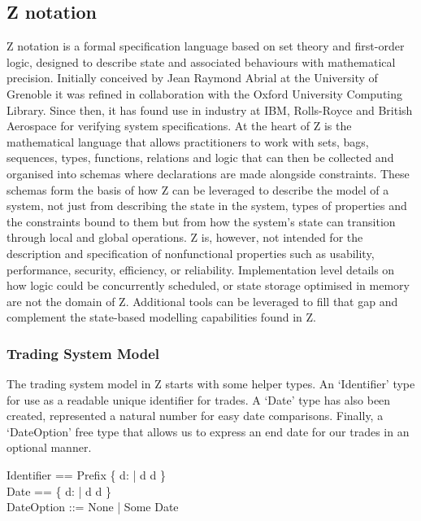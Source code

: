 \documentclass{article}
\begin{document}
\subsection*{Z notation}

Z notation is a formal specification language based on set theory and first-order logic, designed to describe state and associated behaviours with mathematical precision. Initially conceived by Jean Raymond Abrial at the University of Grenoble it was refined in collaboration with the Oxford University Computing Library. Since then, it has found use in industry at IBM, Rolls-Royce and British Aerospace for verifying system specifications.
\newline \newline
At the heart of Z is the mathematical language that allows practitioners to work with sets, bags, sequences, types, functions, relations and logic that can then be collected and organised into schemas where declarations are made alongside constraints. These schemas form the basis of how Z can be leveraged to describe the model of a system, not just from describing the state in the system, types of properties and the constraints bound to them but from how the system’s state can transition through local and global operations.
\newline \newline
Z is, however, not intended for the description and specification of nonfunctional properties such as usability, performance, security, efficiency, or reliability. Implementation level details on how logic could be concurrently scheduled, or state storage optimised in memory are not the domain of Z. Additional tools can be leveraged to fill that gap and complement the state-based modelling capabilities found in Z.

\subsubsection*{Trading System Model}

The trading system model in Z starts with some helper types. An ‘Identifier’ type for use as a readable unique identifier for trades. A ‘Date’ type has also been created, represented a natural number for easy date comparisons.  Finally, a ‘DateOption’ free type that allows us to express an end date for our trades in an optional manner.

\begin{zed}
Identifier == Prefix \cross \{ d: \nat | d  \land d  \} \\ 
Date == \{ d: \nat | d  \land d  \} \\
DateOption ::= None | Some \ldata Date \rdata \\
\end{zed}
\end{document}
